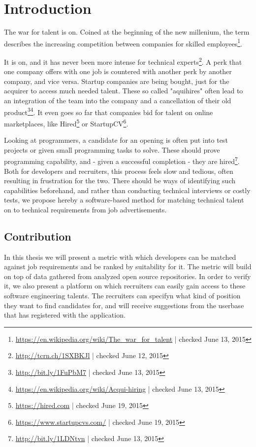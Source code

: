 \chapter{Introduction}\label{ch:introduction}
The war for talent is on. Coined at the beginning of the new
millenium, the term describes the increasing competition between companies
for skilled employees\footnote{\url{https://en.wikipedia.org/wiki/The_war_for_talent} | checked June 13, 2015}.

It is on, and it has never been more intense for technical experts\footnote{\url{http://tcrn.ch/1SXBKJl} | checked June 12, 2015}.
A perk that one company offers with one job is countered with another perk by
another company, and vice versa. Startup companies are being bought,
just for the acquirer to access much needed talent.
These so called "aquihires" often lead to an integration of the team into
the company and a cancellation of their old product\footnote{\url{http://bit.ly/1FuPbM7} | checked June 13, 2015}\footnote{\url{https://en.wikipedia.org/wiki/Acqui-hiring} | checked June 13, 2015}.
It even goes so far that companies bid for talent on online marketplaces, like
Hired\footnote{\url{https://hired.com} | checked June 19, 2015} or StartupCV\footnote{\url{https://www.startupcvs.com/} | checked June 19, 2015}.
\newline

Looking at programmers, a candidate for an opening is often put into test projects or given small programming tasks to solve. These should prove programming capability, and - given a successful completion - they are hired\footnote{\url{http://bit.ly/1LDNtvn} | checked June 13, 2015}. Both for developers and recruiters, this process feels slow and tedious, often resulting in frustration for the two. There should be ways of identifying such capabilities beforehand, and rather than conducting technical interviews or costly tests, we propose hereby a software-based method for matching technical talent on to technical requirements from job advertisements.

\section{Contribution}
In this thesis we will present a metric with which developers can be matched against job requirements and be ranked by suitability for it. The metric will build on top of data gathered from analyzed open source repositories. In order to verify it, we also present a platform on which recruiters can easily gain access to these software engineering talents. The recruiters can specifyn what kind of position they want to find candidates for, and will receive suggestions from the userbase that has registered with the application.

